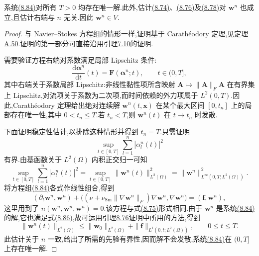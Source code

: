\begin{lemma}[有限维空间中问题解的存在唯一性]
\label{lem:smagorinsky-finite-dimensional-existence}
系统\hyperref[eq:smagorinsky-galerkin-system]{(8.84)}对所有 $T>0$ 均存在唯一解.此外,估计\hyperref[eq:smagorinsky-l2-stability]{(8.74)}、\hyperref[eq:smagorinsky-energy-estimate]{(8.76)}及\hyperref[eq:smagorinsky-h1-stability]{(8.78)}对 $\bm{w}^n$ 也成立,且估计右端与 $n$ 无关.因此 $\bm{w}^n\in V$.
\begin{proof}
与 Navier--Stokes 方程组的情形一样,证明基于 Carathéodory 定理,见定理\hyperref[thm:appendix-a-50]{A.50}.证明的第一部分可直接沿用引理\hyperref[lem:time-dependent-galerkin-unique]{7.10}的证明.

需要验证方程右端对系数满足局部 Lipschitz 条件:
\begin{equation}\label{eq:smagorinsky-galerkin-ode}
 \frac{\mathrm{d}\symbf{\alpha}^n}{\mathrm{d}t}(t)
 =\bm{F}(\symbf{\alpha}^n;t),
 \qquad t\in(0,T],
\end{equation}
其中右端关于系数局部 Lipschitz:非线性黏性项所含映射 $\bm{A}\mapsto\|\bm{A}\|_F\bm{A}$ 在有界集上 Lipschitz,对流项关于系数为二次项,而时间依赖的外力项属于 $L^2(0,T)$.因此,Carathéodory 定理给出绝对连续解 $\bm{w}^n(t,\bm{x})$ 在某个最大区间 $[0,t_n]$ 上的局部存在唯一性,其中 $0<t_n\le T$.若 $t_n<T$,则 $\bm{w}^n(t)$ 在 $t\to t_n$ 时发散.

下面证明稳定性估计,以排除这种情形并得到 $t_n=T$.只需证明
\[
 \sup_{t\in[0,T]}\sum_{l=1}^{n}|\alpha_l^n(t)|^2
\]
有界.由基函数关于 $L^2(\Omega)$ 内积正交归一可知
\[
 \sup_{t\in[0,T]}\sum_{l=1}^{n}|\alpha_l^n(t)|^2
 =\sup_{t\in[0,T]}\|\bm{w}^n(t)\|_{L^2(\Omega)}^2
 =\|\bm{w}^n\|_{L^\infty(0,T;L^2(\Omega))}^2.
\]
将方程组\hyperref[eq:smagorinsky-galerkin-system]{(8.84)}各式作线性组合,得到
\begin{equation}\label{eq:smagorinsky-galerkin-energy-identity}
 (\partial_t\bm{w}^n,\bm{w}^n)
 +\bigl((\nu+\nu_{\mathrm{Sm}}\|\nabla\bm{w}^n\|_F)
         \nabla\bm{w}^n,\nabla\bm{w}^n\bigr)
 =(\bm{f},\bm{w}^n),
\end{equation}
这里用到了 $n(\bm{w}^n,\bm{w}^n,\bm{w}^n)=0$.该方程与式\hyperref[eq:smagorinsky-energy-identity]{(8.75)}形式相同.由于 $\bm{w}^n$ 是系统\hyperref[eq:smagorinsky-galerkin-system]{(8.84)}的解,它也满足式\hyperref[eq:smagorinsky-galerkin-energy-identity]{(8.86)},故可运用引理\hyperref[lem:smagorinsky-l2-stability]{8.76}证明中所用的方法,得到
\[
 \|\bm{w}^n(t)\|_{L^2(\Omega)}
 \le \|\bm{w}_0\|_{L^2(\Omega)}
    +\|\bm{f}\|_{L^1(0,t;L^2(\Omega))},
 \qquad 0\le t\le T.
\]
此估计关于 $n$ 一致,给出了所需的先验有界性,因而解不会发散,系统\hyperref[eq:smagorinsky-galerkin-system]{(8.84)}在 $(0,T]$ 上存在唯一解.


\end{proof}
\end{lemma}
